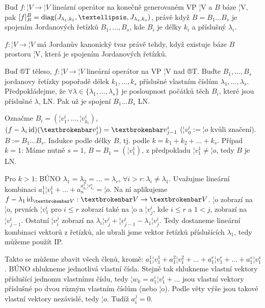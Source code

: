 \documentclass[12pt]{article}                   %
\begin{document}
        \begin{tvrzeni}
            Buď $f: ¦V \rightarrow ¦V$ lineární operátor na konečně generovaném VP ¦V a $B$ báze ¦V, pak $[f]_B^B = \diag(J_{\lambda_1, k_1}, …, J_{\lambda_s, k_s})$, právě když $B = B_1…B_s$ je spojením Jordanových řetízků $B_1, …, B_s$, kde $B_i$ je délky $k_i$ a příslušný $\lambda_i$.
        \end{tvrzeni}

        \begin{dusledek}
            $f: ¦V \rightarrow ¦V$ má Jordanův kanonický tvar právě tehdy, když existuje báze $B$ prostoru ¦V, která je spojením Jordanových řetízků.
        \end{dusledek}

        \begin{veta}
            Buď ®T těleso, $f: ¦V \rightarrow ¦V$ lineární operátor na VP ¦V nad ®T. Buďte $B_1, …, B_s$ jordanovy řetízky popořadě délek $k_1, …, k_s$ příslušné vlastním číslům $\lambda_1, …, \lambda_s$. Předpokládejme, že $\forall \lambda \in \{\lambda_1, …, \lambda_s\}$ je posloupnost počátků těch $B_i$, které jsou příslušné $\lambda$, LN. Pak už je spojení $B_1…B_s$ LN.


            \begin{dukazin}
                Označme $B_i = (¦v_1^i, …, ¦v_{k_i}^i)$, $(f - \lambda_i \id)(¦v_j^i) = ¦v_{j-1}^i$ ($¦v_0^i := ¦o$ kvůli značení). $B:=B_1…B_s$. Indukce podle délky $B$, tj. podle $k = k_1 + k_2 + … + k_s$. Případ $k=1$: Máme nutně $s=1$, $B=B_1=(¦v_1^1)$, z předpokladu $¦v_1^1 ≠ ¦o$, tedy $B$ je LN.

                Pro $k > 1$: BÚNO $\lambda_1 = \lambda_2 = … = \lambda_r$, $\forall i > r: \lambda_i ≠ \lambda_1$. Uvažujme lineární kombinaci $a_1^1¦v_1^1 + … + a_n^{a^s_{k_s}¦v^s_{k_s}} = ¦o$. Na ní aplikujeme $f - \lambda_1 \id_{¦V}: ¦V \rightarrow ¦V$. ¦o zobrazí na ¦o, prvních $¦v^i_1$ pro $i ≤ r$ zobrazí také na ¦o a $¦v^i_j$, kde $i ≤ r$ a $1<j$, zobrazí na $¦v_{j-1}^i$. Ostatní $¦v_i^j$ zobrazí na $\lambda_i¦v_j^i + ¦v_{j-1}^i - \lambda_1¦v_j^i$. Tedy dostaneme lineární kombinaci vektorů z řetízků, ale ubrali jsme vektor řetízků příslušících $\lambda_1$, tedy můžeme použít IP.

                Takto se můžeme zbavit všech členů, kromě: $a_1^1¦v_1^1 + a_1^2¦v_1^2 + … + a_1^r¦v_1^r + … + a_1^s¦v_1^s$. BÚNO shlukneme jednotlivá vlastní čísla. Stejně tak shlukneme vlastní vektory příslušící jednomu vlastnímu číslu, tedy $¦w_k = a_1^i¦v_1^i + …$ jsou vlastní vektory příslušné po dvou různým vlastním číslům (nebo ¦o). Podle věty výše jsou takové vlastní vektory nezávislé, tedy $¦o$. Tudíž $a_i^j = 0$.
            \end{dukazin}
        \end{veta}
\end{document}
